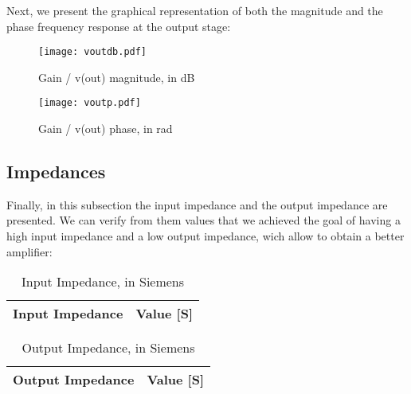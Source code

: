 \par Next, we present the graphical representation of both the magnitude and the phase frequency response at the output stage:\par
 

\begin{figure}[H] \centering
\texttt{[image: voutdb.pdf]}
\caption{Gain / v(out) magnitude, in dB}
\label{fig:voutdb}
\end{figure}

\begin{figure}[H] \centering
\texttt{[image: voutp.pdf]}
\caption{Gain / v(out) phase, in rad}
\label{fig:voutp}
\end{figure}


\subsection{Impedances}
\label{impedances}
Finally, in this subsection the input impedance and the output impedance are presented. We can verify from them values that we achieved the goal of having a high input impedance and a low output impedance, wich allow to obtain a better amplifier:


\begin{table}[H]
  \centering
  \begin{tabular}{|l|r|}
    \hline    
    {\bf Input Impedance} & {\bf Value [S]} \\ \hline
    
  \end{tabular}
  \caption{Input Impedance, in Siemens}
  \label{tab:input_z}
\end{table}


\begin{table}[H]
  \centering
  \begin{tabular}{|l|r|}
    \hline    
    {\bf Output Impedance} & {\bf Value [S]} \\ \hline
    
  \end{tabular}
  \caption{Output Impedance, in Siemens}
  \label{tab:output_z}
\end{table}



